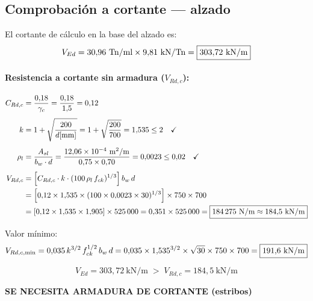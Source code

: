 \subsection{Comprobación a cortante — alzado}
\label{subsec:cortante_fuste}

El cortante de cálculo en la base del alzado es:
\[
  V_{Ed} = 30{,}96~\text{Tn/ml} \times 9{,}81~\text{kN/Tn}
         = \boxed{303{,}72~\text{kN/m}}
\]

\paragraph{Resistencia a cortante sin armadura ($V_{Rd,c}$):}
\begin{align*}
  C_{Rd,c} &= \frac{0{,}18}{\gamma_c} = \frac{0{,}18}{1{,}5} = 0{,}12 \\[4pt]
  k &= 1 + \sqrt{\frac{200}{d[\mathrm{mm}]}}
     = 1 + \sqrt{\frac{200}{700}} = 1{,}535 \leq 2 \quad\checkmark \\[4pt]
  \rho_l &= \frac{A_{sl}}{b_w \cdot d}
          = \frac{12{,}06 \times 10^{-4}~\text{m}^2/\text{m}}{0{,}75 \times 0{,}70}
          = 0{,}0023 \leq 0{,}02 \quad\checkmark \\[4pt]
  V_{Rd,c} &= \left[C_{Rd,c}\cdot k\cdot(100\,\rho_l\,f_{ck})^{1/3}\right]b_w\,d \\
           &= \left[0{,}12\times 1{,}535\times(100\times 0{,}0023\times 30)^{1/3}\right]
             \times 750 \times 700 \\
           &= \left[0{,}12\times 1{,}535\times 1{,}905\right]\times 525\,000
            = 0{,}351\times 525\,000 = \boxed{184\,275~\text{N/m} \approx 184{,}5~\text{kN/m}}
\end{align*}

Valor mínimo:
\[
  V_{Rd,c,\min} = 0{,}035\,k^{3/2}\,f_{ck}^{1/2}\,b_w\,d
    = 0{,}035\times 1{,}535^{3/2}\times\sqrt{30}\times 750\times 700
    = \boxed{191{,}6~\text{kN/m}}
\]

\begin{resultadobox}
  \[
    V_{Ed} = 303{,}72~\text{kN/m} \;>\; V_{Rd,c} = 184{,}5~\text{kN/m}
  \]
  \begin{center}
    \textbf{SE NECESITA ARMADURA DE CORTANTE (estribos)}
  \end{center}
\end{resultadobox}

